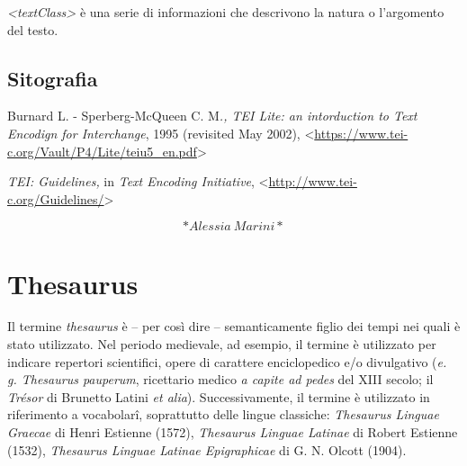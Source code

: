 \documentclass[
  b5paper,
  twoside,
  12pt,
  chapterprefix=false,
  bibliography=totocnumbered,
  parskip=false]{scrbook}
\begin{document}
\emph{\textless textClass\textgreater{}} è una serie di informazioni che descrivono la natura o
l'argomento del testo.

\hypertarget{sitografia-31}{%
\section*{Sitografia}\label{sitografia-31}}

Burnard L. - Sperberg-McQueen C. M\emph{., TEI Lite: an intorduction to Text
Encodign for Interchange}, 1995 (revisited May 2002),
\textless{}\href{https://www.tei-c.org/Vault/P4/Lite/teiu5_en.pdf}{{https://www.tei-c.org/Vault/P4/Lite/teiu5\_en.pdf}}\textgreater{}

\emph{TEI: Guidelines,} in \emph{Text Encoding Initiative},
\textless{}\href{http://www.tei-c.org/Guidelines/}{{http://www.tei-c.org/Guidelines/}}\textgreater{}

\[*Alessia~Marini*\]

\hypertarget{thesaurus}{%
\chapter{Thesaurus}\label{thesaurus}}

Il termine \emph{thesaurus} è -- per così dire -- semanticamente figlio dei
tempi nei quali è stato utilizzato. Nel periodo medievale, ad esempio,
il termine è utilizzato per indicare repertori scientifici, opere di
carattere enciclopedico e/o divulgativo (\emph{e. g. Thesaurus pauperum},
ricettario medico \emph{a capite ad pedes} del XIII secolo; il \emph{Trésor} di
Brunetto Latini \emph{et alia}). Successivamente, il termine è utilizzato in
riferimento a vocabolarî, soprattutto delle lingue classiche: \emph{Thesaurus
Linguae Graecae} di Henri Estienne (1572), \emph{Thesaurus Linguae Latinae}
di Robert Estienne (1532), \emph{Thesaurus Linguae Latinae Epigraphicae} di
G. N. Olcott (1904).
\end{document}
